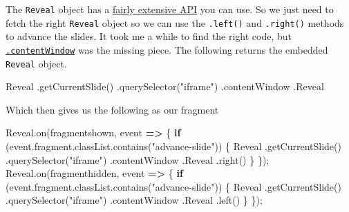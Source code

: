 \documentclass[
  letterpaper,
  DIV=11,
  numbers=noendperiod]{scrreprt}
\newenvironment{Shaded}{\begin{snugshade}}{\end{snugshade}}
\newcommand{\AttributeTok}[1]{\textcolor[rgb]{0.40,0.45,0.13}{#1}}
\newcommand{\BuiltInTok}[1]{\textcolor[rgb]{0.00,0.23,0.31}{#1}}
\newcommand{\ControlFlowTok}[1]{\textcolor[rgb]{0.00,0.23,0.31}{\textbf{#1}}}
\newcommand{\FunctionTok}[1]{\textcolor[rgb]{0.28,0.35,0.67}{#1}}
\newcommand{\KeywordTok}[1]{\textcolor[rgb]{0.00,0.23,0.31}{\textbf{#1}}}
\newcommand{\NormalTok}[1]{\textcolor[rgb]{0.00,0.23,0.31}{#1}}
\newcommand{\OperatorTok}[1]{\textcolor[rgb]{0.37,0.37,0.37}{#1}}
\newcommand{\StringTok}[1]{\textcolor[rgb]{0.13,0.47,0.30}{#1}}
\begin{document}
The \texttt{Reveal} object has a \href{https://revealjs.com/api/}{fairly
extensive API} you can use. So we just need to fetch the right
\texttt{Reveal} object so we can use the \texttt{.left()} and
\texttt{.right()} methods to advance the slides. It took me a while to
find the right code, but
\href{https://developer.mozilla.org/en-US/docs/Web/API/HTMLIFrameElement/contentWindow}{\texttt{.contentWindow}}
was the missing piece. The following returns the embedded
\texttt{Reveal} object.

\begin{Shaded}
\begin{Highlighting}[]
\NormalTok{Reveal}
  \OperatorTok{.}\FunctionTok{getCurrentSlide}\NormalTok{()}
  \OperatorTok{.}\FunctionTok{querySelector}\NormalTok{(}\StringTok{"iframe"}\NormalTok{)}
  \OperatorTok{.}\AttributeTok{contentWindow}
  \OperatorTok{.}\AttributeTok{Reveal}
\end{Highlighting}
\end{Shaded}

Which then gives us the following as our fragment

\begin{Shaded}
\begin{Highlighting}[]
\NormalTok{Reveal}\OperatorTok{.}\FunctionTok{on}\NormalTok{(}\StringTok{\textquotesingle{}fragmentshown\textquotesingle{}}\OperatorTok{,} \BuiltInTok{event} \KeywordTok{=\textgreater{}}\NormalTok{ \{}
  \ControlFlowTok{if}\NormalTok{ (}\BuiltInTok{event}\OperatorTok{.}\AttributeTok{fragment}\OperatorTok{.}\AttributeTok{classList}\OperatorTok{.}\FunctionTok{contains}\NormalTok{(}\StringTok{"advance{-}slide"}\NormalTok{)) \{}
\NormalTok{ Reveal}
      \OperatorTok{.}\FunctionTok{getCurrentSlide}\NormalTok{()}
       \OperatorTok{.}\FunctionTok{querySelector}\NormalTok{(}\StringTok{"iframe"}\NormalTok{)}
      \OperatorTok{.}\AttributeTok{contentWindow}
      \OperatorTok{.}\AttributeTok{Reveal}
      \OperatorTok{.}\FunctionTok{right}\NormalTok{()}
\NormalTok{    \}}
\NormalTok{\})}\OperatorTok{;}
\NormalTok{Reveal}\OperatorTok{.}\FunctionTok{on}\NormalTok{(}\StringTok{\textquotesingle{}fragmenthidden\textquotesingle{}}\OperatorTok{,} \BuiltInTok{event} \KeywordTok{=\textgreater{}}\NormalTok{ \{}
  \ControlFlowTok{if}\NormalTok{ (}\BuiltInTok{event}\OperatorTok{.}\AttributeTok{fragment}\OperatorTok{.}\AttributeTok{classList}\OperatorTok{.}\FunctionTok{contains}\NormalTok{(}\StringTok{"advance{-}slide"}\NormalTok{)) \{}
\NormalTok{ Reveal}
      \OperatorTok{.}\FunctionTok{getCurrentSlide}\NormalTok{()}
      \OperatorTok{.}\FunctionTok{querySelector}\NormalTok{(}\StringTok{"iframe"}\NormalTok{)}
      \OperatorTok{.}\AttributeTok{contentWindow}
      \OperatorTok{.}\AttributeTok{Reveal}
      \OperatorTok{.}\FunctionTok{left}\NormalTok{()}
\NormalTok{    \}}
\NormalTok{\})}\OperatorTok{;}
\end{Highlighting}
\end{Shaded}
\end{document}
